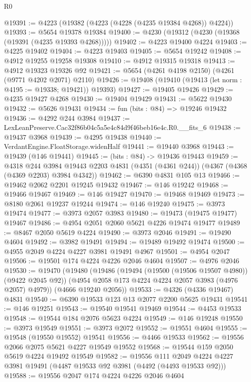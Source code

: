 \begin{lexlean}{R0}
\begin{coremodule}
@19391 := @4223 (@19382 (@4223 (@4228 (@4235 @19384 @4268)) @4224))
@19393 := @5654 @19378 @19384
@19400 := @4230 (@19312 (@4230 (@19368 (@19391 (@4235 @19393 @4268)))))
@19402 := @4223 @19400 @4224
@19403 := @4225 @19402
@19404 := @4223 @19403
@19405 := @5654 @19242
@19408 := @4912 @19255 @19258 @19308
@19410 := @4912 @19315 @19318
@19413 := @4912 @19323 @19326 @92
@19421 := @5654 (@4261 @4198 @2150) (@4261 (@9771 @4202 @2071) @2110)
@19426 := @19408 (@19410 (@19413 (let norm : @4195 := @19338; @19421)) @19393)
@19427 := @19405 @19426
@19429 := @4235 @19427 @4268
@19430 := @19404 @19429
@19431 := @5622 @19430
@19432 := @5626 @19431
@19434 := fun (bits : @84) => @19246 @19432
@19436 := @4292 @244 @3984
@19437 := LexLeanPreserve.Cac32f86b04c5a5e4c84d9f46beb16e4c.R0.__fits_6
@19438 := @19437 @3968
@19439 := @4295 @19438
@19440 := VerdantEngine.FloatStorage.widenHalf
@19441 := @19440 @3968
@19443 := @19439 (@146 @19441)
@19445 := (bits : @84) -> @19436 @19443
@19459 := @4318
    @244
    @3984
    @19443
    @2203
    @4831
    (@4351 (@4361 @244))
    (@4367 (@4368 (@4369 @2203) @3984 @4342))
@19462 := @6390 @4831 @105 @13
@19466 := @19462 @2062 @2201 @19245 @19432
@19467 := @146 @19242
@19468 := @19466 @19467
@19469 := @146 @19427
@19470 := @19468 @19469
@19473 := @8180 @2061 @19237 @19244
@19474 := @146 @19240
@19475 := @3973 @19474
@19477 := @3973 @2057 @3983
@19480 := @19473 (@19475 @19477) @19467
@19486 := @4954 @2051 @2060 @5621 @4226 @19474 @19477
@19489 := @8467 @2050 @5619 @4224
@19490 := @3973 @2046
@19491 := @19490 @4604
@19492 := @3982 @19491
@19494 := @19489 @19492 @19474
@19500 := @4955 @2049 @4224 @4227 @3981 @19491 @4967
@19501 := @4954 @2047
@19506 := @19501 @174 @4224 @4226 @2046 @4604
@19507 := @4976 @2046
@19530 := @19470
    (@19480
      (@19486
        (@19494 (@19500 (@19506 @19507 @4980)) (@9422 @2045 @92))
        (@4954 @2058 @173 @4224 @4224 @2057 @3983 (@4976 @2057) @4979))
      (@4666 @19240 @2056))
@19533 := @4326 (@4336 @19467) @4831
@19540 := @6390 @19533 @123 @13 @2077 @2200 @5625 @19431
@19541 := @146 @19251
@19543 := @19540 @19541 @19469
@19544 := @4453 @19533
@19548 := @19544 @184 @2076 @5623 @4224
@19549 := @146 @19248
@19550 := @3973 @19549
@19551 := @3973 @2072
@19552 := @19551 @4604
@19555 := @19548 (@19550 @19552) @19541
@19556 := @4466 @19533
@19562 := @19556 @2066 @2075 @5621 @4227 @19549 @19552
@19568 := @19544 @159 @2050 @5619 @4224 @19492 @19549
@19582 := @19556
    @111
    @2049
    @4224
    @4227
    @3981
    @19491
    (@4487 @19533 @92 @3981 (@4492 (@4493 @19533 @92)))
@19588 := @19556 @2047 @174 @4224 @4226 @2046 @4604

\end{coremodule}
\end{lexlean}
